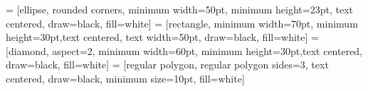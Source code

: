 \documentclass[12pt,a4paper]{report}
\begin{document}
 = [ellipse, rounded corners, minimum width=50pt, minimum height=23pt, text centered, draw=black, fill=white]
 = [rectangle, minimum width=70pt, minimum height=30pt,text centered, text width=50pt, draw=black, fill=white]
 = [diamond, aspect=2, minimum width=60pt, minimum height=30pt,text centered, draw=black, fill=white]
 = [regular polygon, regular polygon sides=3, text centered, draw=black, minimum size=10pt, fill=white]
\newcommand{\tnode}[5]{
  \node (#1) [#2, xshift=#4-0pt, yshift=#5-0pt] {\scriptsize #3};
}
\newcommand{\tnanode}[7]{
  \node (#1) [#2, xshift=#4-0pt, yshift=#5-0pt, #6 = of #7] {\scriptsize #3};
}
\newcommand{\tline}[3]{
  \draw [#3] (#1) -- (#2);
}
\newenvironment*{mypara}%
{\noindent\ignorespaces}%
{\par\noindent%
  \ignorespacesafterend}
\end{document}
